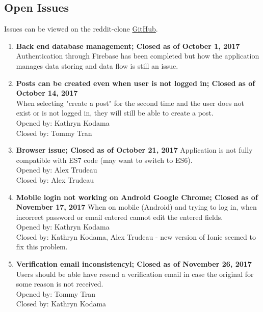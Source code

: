 \documentclass[12pt,fleqn]{article}
\begin{document}
\subsection {Open Issues}
Issues can be viewed on the reddit-clone \href{https://gitlab.cas.mcmaster.ca/trudeaua/reddit-clone/issues?scope=all&utf8=%E2%9C%93&state=all}{GitHub}. \\
\begin{enumerate}
\item \textbf{Back end database management; Closed as of October 1, 2017} \\
Authentication through Firebase has been completed but how the application manages data storing and data flow is still an issue. \\

\item \textbf{Posts can be created even when user is not logged in; Closed as of October 14, 2017}\\
When selecting "create a post" for the second time and the user does not exist or is not logged in, they will still be able to create a post. \\
Opened by: Kathryn Kodama \\
Closed by: Tommy Tran \\

\item \textbf{Browser issue; Closed as of October 21, 2017}
Application is not fully compatible with ES7 code (may want to switch to ES6).\\
Opened by: Alex Trudeau \\
Closed by: Alex Trudeau \\

\item \textbf{Mobile login not working on Android Google Chrome; Closed as of November 17, 2017}
When on mobile (Android) and trying to log in, when incorrect password or email entered cannot edit the entered fields. \\
Opened by: Kathryn Kodama \\
Closed by: Kathryn Kodama, Alex Trudeau - new version of Ionic seemed to fix this problem. \\

\item \textbf{Verification email inconsistencyl; Closed as of November 26, 2017} \\
Users should be able have resend a verification email in case the original for some reason is not received. \\
Opened by: Tommy Tran \\
Closed by: Kathryn Kodama \\


\end{enumerate}
\end{document}
